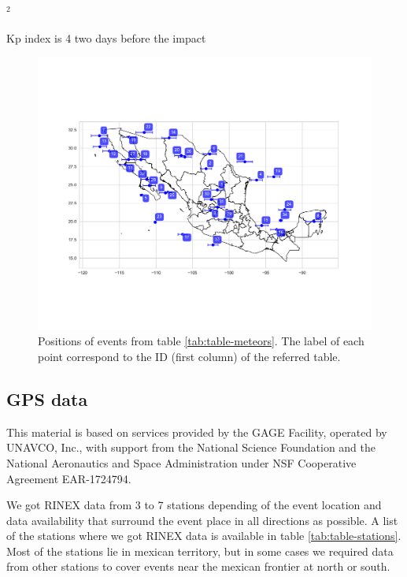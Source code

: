 \begin{table}
\begin{minipage}{0.9\linewidth}
      \hypertarget{note2}{${}^2$}Kp index is 4 two days before the impact 
    \end{minipage}

\end{table}

\begin{figure}
  \centering
  \includegraphics[width=\linewidth]{../meteors_map}
  \caption{Positions of events from table \ref{tab:table-meteors}. The label of each point correspond to the ID (first column) of the referred table.}
  \label{fig:meteors-map}
\end{figure}



\subsection{GPS data}
\label{ssec:GPS}
This material is based on services provided by the GAGE Facility, operated by UNAVCO, Inc., with support from the National Science Foundation and the National Aeronautics and Space Administration under NSF Cooperative Agreement EAR-1724794.

We got RINEX data from 3 to 7 stations depending of the event location and data availability that surround the event place in all directions as possible. A list of the stations where we got RINEX data is available in table \ref{tab:table-stations}. Most of the stations lie in mexican territory, but in some cases we required data from other stations to cover events near the mexican frontier at north or south.


